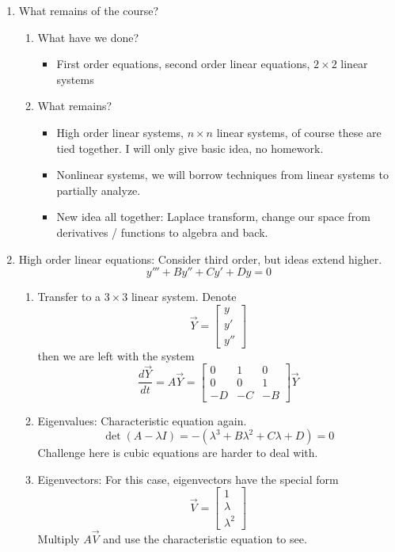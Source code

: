\documentclass{article}
\begin{document}
\begin{enumerate}

\item What remains of the course?
\begin{enumerate}
\item What have we done?
\begin{itemize}
\item First order equations, second order linear equations, $2\times 2$ linear systems
\end{itemize}
\item What remains?
\begin{itemize}
\item High order linear systems, $n \times n$ linear systems, of course these are tied together. I will only give basic idea, no homework.
\item Nonlinear systems, we will borrow techniques from linear systems to partially analyze.
\item New idea all together: Laplace transform, change our space from derivatives / functions to algebra and back.
\end{itemize}
\end{enumerate}


\item High order linear equations: Consider third order, but ideas extend higher.
\[
y''' + By'' + Cy' + Dy = 0
\]
\begin{enumerate}
\item Transfer to a $3 \times 3$ linear system. Denote
\[
\vec{Y} = \begin{bmatrix}
y \\ y' \\ y''
\end{bmatrix}
\]
then we are left with the system
\[
\frac{d\vec{Y}}{dt} = A \vec{Y} = \begin{bmatrix}
0 & 1 & 0 \\
0 & 0 & 1 \\
-D & -C & -B
\end{bmatrix} \vec{Y}
\]

\item Eigenvalues: Characteristic equation again.
\[
\det(A-\lambda I) = -(\lambda^3+B\lambda^2+C\lambda+D) = 0
\]
Challenge here is cubic equations are harder to deal with.

\item Eigenvectors: For this case, eigenvectors have the special form
\[
\vec{V} = \begin{bmatrix}
1 \\ \lambda \\ \lambda^2
\end{bmatrix}
\]
Multiply $A\vec{V}$ and use the characteristic equation to see.


\end{enumerate}
\end{enumerate}
\end{document}
